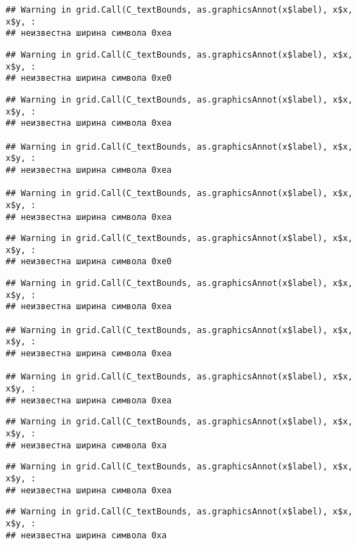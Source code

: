 \documentclass[
]{article}
\begin{document}
\begin{verbatim}
## Warning in grid.Call(C_textBounds, as.graphicsAnnot(x$label), x$x, x$y, :
## неизвестна ширина символа 0xea
\end{verbatim}

\begin{verbatim}
## Warning in grid.Call(C_textBounds, as.graphicsAnnot(x$label), x$x, x$y, :
## неизвестна ширина символа 0xe0
\end{verbatim}

\begin{verbatim}
## Warning in grid.Call(C_textBounds, as.graphicsAnnot(x$label), x$x, x$y, :
## неизвестна ширина символа 0xea

## Warning in grid.Call(C_textBounds, as.graphicsAnnot(x$label), x$x, x$y, :
## неизвестна ширина символа 0xea

## Warning in grid.Call(C_textBounds, as.graphicsAnnot(x$label), x$x, x$y, :
## неизвестна ширина символа 0xea
\end{verbatim}

\begin{verbatim}
## Warning in grid.Call(C_textBounds, as.graphicsAnnot(x$label), x$x, x$y, :
## неизвестна ширина символа 0xe0
\end{verbatim}

\begin{verbatim}
## Warning in grid.Call(C_textBounds, as.graphicsAnnot(x$label), x$x, x$y, :
## неизвестна ширина символа 0xea

## Warning in grid.Call(C_textBounds, as.graphicsAnnot(x$label), x$x, x$y, :
## неизвестна ширина символа 0xea

## Warning in grid.Call(C_textBounds, as.graphicsAnnot(x$label), x$x, x$y, :
## неизвестна ширина символа 0xea
\end{verbatim}

\begin{verbatim}
## Warning in grid.Call(C_textBounds, as.graphicsAnnot(x$label), x$x, x$y, :
## неизвестна ширина символа 0xa
\end{verbatim}

\begin{verbatim}
## Warning in grid.Call(C_textBounds, as.graphicsAnnot(x$label), x$x, x$y, :
## неизвестна ширина символа 0xea
\end{verbatim}

\begin{verbatim}
## Warning in grid.Call(C_textBounds, as.graphicsAnnot(x$label), x$x, x$y, :
## неизвестна ширина символа 0xa
\end{verbatim}
\end{document}
